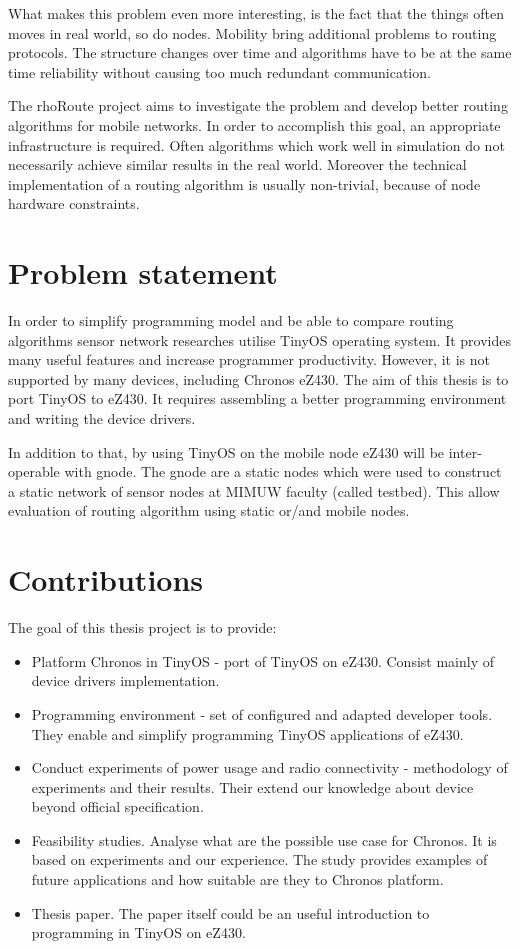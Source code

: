 What makes this problem even more interesting, is the fact that the things often moves in real world, so do nodes.
Mobility bring additional problems to routing protocols.
The structure changes over time and algorithms have to be at the same time reliability without causing too much redundant communication.

The rhoRoute project aims to investigate the problem and develop better routing algorithms for mobile networks. In order to accomplish this goal, an appropriate infrastructure is required.
Often algorithms which work well in simulation do not necessarily achieve similar results in the real world. Moreover the technical implementation of a routing algorithm is usually non-trivial, because of node hardware constraints.

\section{Problem statement}
In order to simplify programming model and be able to compare routing algorithms sensor network researches utilise TinyOS operating system. It provides many useful features and increase programmer productivity. However, it is not supported by many devices, including Chronos eZ430. The aim of this thesis is to port TinyOS to eZ430. It requires assembling a better programming environment and writing the device drivers.

In addition to that, by using TinyOS on the mobile node eZ430 will be inter-operable with gnode. The gnode are a static nodes which were used to construct a static network of sensor nodes at MIMUW faculty (called testbed). This allow evaluation of routing algorithm using static or/and mobile nodes. 

\section{Contributions}
The goal of this thesis project is to provide:
\begin{itemize}
  \item Platform Chronos in TinyOS - port of TinyOS on eZ430. Consist mainly of device drivers implementation.
  \item Programming environment - set of configured and adapted developer tools. They enable and simplify programming TinyOS applications of eZ430.
  \item Conduct experiments of power usage and radio connectivity - methodology of experiments and their results. Their extend our knowledge about device beyond official specification.
  \item Feasibility studies. Analyse what are the possible use case for Chronos. It is based on experiments and our experience. The study provides examples of future applications and how suitable are they to Chronos platform.
  \item Thesis paper. The paper itself could be an useful introduction to programming in TinyOS on eZ430.
\end{itemize}

